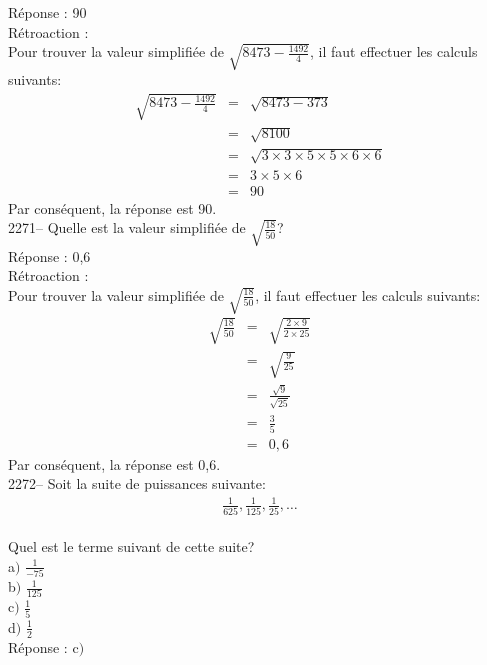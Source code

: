 \documentclass[letterpaper, 12pt]{article}
\begin{document}
R\'eponse : 90\\

R\'etroaction :\\
Pour trouver la valeur simplifi\'ee de $\sqrt{8473-\frac{1492}{4}}$, il faut effectuer les calculs suivants:
\begin{eqnarray*}
\sqrt{8473-\frac{1492}{4}}&=&\sqrt{8473-373}\\
&=&\sqrt{8100}\\
&=&\sqrt{3\times3\times5\times5\times6\times6}\\
&=&3\times5\times6\\
&=&90
\end{eqnarray*}
Par cons\'equent, la r\'eponse est 90.\\

2271--  Quelle est la valeur simplifi\'ee de $\sqrt{\frac{18}{50}}$?\\

R\'eponse : 0,6\\

R\'etroaction :\\
Pour trouver la valeur simplifi\'ee de $\sqrt{\frac{18}{50}}$, il faut effectuer les calculs suivants:
\begin{eqnarray*}
\sqrt{\frac{18}{50}}&=&\sqrt{\frac{2\times9}{2\times25}}\\[2mm]
&=&\sqrt{\frac{9}{25}}\\[2mm]
&=&\frac{\sqrt{9}}{\sqrt{25}}\\
&=&\frac{3}{5}\\
&=&0,6
\end{eqnarray*}
Par cons\'equent, la r\'eponse est 0,6.\\


2272-- Soit la suite de puissances suivante:\\
\begin{eqnarray*}
\frac{1}{625}, \frac{1}{125}, \frac{1}{25},\ldots
\end{eqnarray*}\\
Quel est le terme suivant de cette suite?\\

a$)$ $\frac{1}{-75}$\\[2mm]
b$)$ $\frac{1}{125}$\\[2mm]
c$)$ $\frac{1}{5}$\\[2mm]
d$)$ $\frac{1}{2}$\\

R\'eponse : c$)$\\
\end{document}
